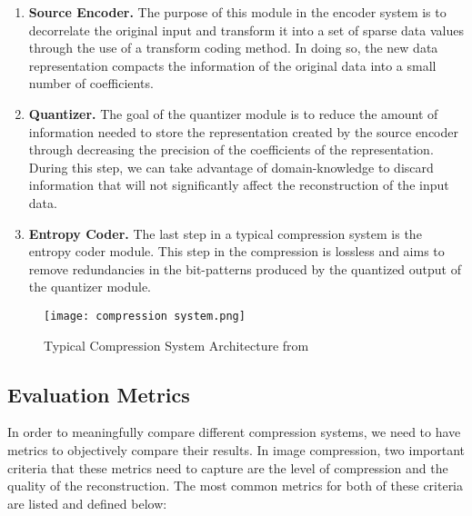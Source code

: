\documentclass[review,onefignum,onetabnum]{siamart190516}
\begin{document}
\begin{enumerate}[label=\textbf{(\alph*)}]
  \item \textbf{Source Encoder.} 
  The purpose of this module in the encoder system is to decorrelate the original
  input and transform it into a set of sparse data values through the use of a 
  transform coding method. In doing so, the new data representation compacts the
  information of the original data into a small number of coefficients.

  \item \textbf{Quantizer.}
  The goal of the quantizer module is to reduce the amount of information needed
  to store the representation created by the source encoder through decreasing 
  the precision of the coefficients of the representation. During this step,
  we can take advantage of domain-knowledge to discard information that will not
  significantly affect the reconstruction of the input data.

  \item \textbf{Entropy Coder.}
  The last step in a typical compression system is the entropy coder module.
  This step in the compression is lossless and aims to remove redundancies in the
  bit-patterns produced by the quantized output of the quantizer module.
\end{enumerate}

\begin{figure}[tbhp]
  \centering
  \texttt{[image: compression system.png]}
  \caption{Typical Compression System Architecture from \cite{raid2014jpeg}}
  \label{fig:compression-arch}
\end{figure}

\subsection{Evaluation Metrics}
In order to meaningfully compare different compression systems, we need to have
metrics to objectively compare their results. In image compression, two important
criteria that these metrics need to capture are the level of compression and the
quality of the reconstruction. The most common metrics for both of these criteria
are listed and defined below:
\end{document}
